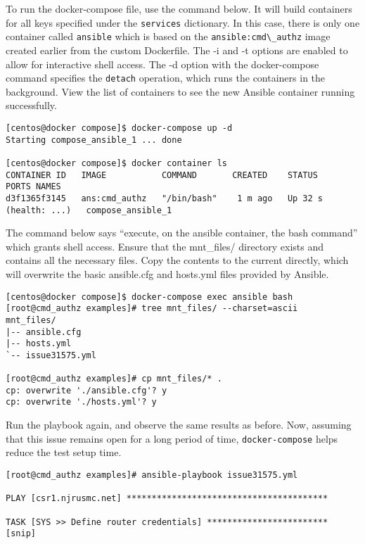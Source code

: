 To run the docker-compose file, use the command below. It will build
containers for all keys specified under the \verb|services| dictionary. In this
case, there is only one container called \verb|ansible| which is based on the
\verb|ansible:cmd\_authz| image created earlier from the custom Dockerfile. The -i
and -t options are enabled to allow for interactive shell access. The -d
option with the docker-compose command specifies the \verb|detach| operation, which
runs the containers in the background. View the list of containers to see the
new Ansible container running successfully.

\begin{verbatim}
[centos@docker compose]$ docker-compose up -d
Starting compose_ansible_1 ... done

[centos@docker compose]$ docker container ls
CONTAINER ID   IMAGE           COMMAND       CREATED    STATUS            PORTS NAMES
d3f1365f3145   ans:cmd_authz   "/bin/bash"    1 m ago   Up 32 s (health: ...)   compose_ansible_1
\end{verbatim}

The command below says ``execute, on the ansible container, the bash command''
which grants shell access. Ensure that the mnt\_files/ directory exists and
contains all the necessary files. Copy the contents to the current directly,
which will overwrite the basic ansible.cfg and hosts.yml files provided by
Ansible.

\begin{verbatim}
[centos@docker compose]$ docker-compose exec ansible bash
[root@cmd_authz examples]# tree mnt_files/ --charset=ascii
mnt_files/
|-- ansible.cfg
|-- hosts.yml
`-- issue31575.yml

[root@cmd_authz examples]# cp mnt_files/* .
cp: overwrite './ansible.cfg'? y
cp: overwrite './hosts.yml'? y
\end{verbatim}

Run the playbook again, and observe the same results as before. Now, assuming
that this issue remains open for a long period of time, \verb|docker-compose|
helps reduce the test setup time.

\begin{verbatim}
[root@cmd_authz examples]# ansible-playbook issue31575.yml 

PLAY [csr1.njrusmc.net] ****************************************

TASK [SYS >> Define router credentials] ************************
[snip]
\end{verbatim}

